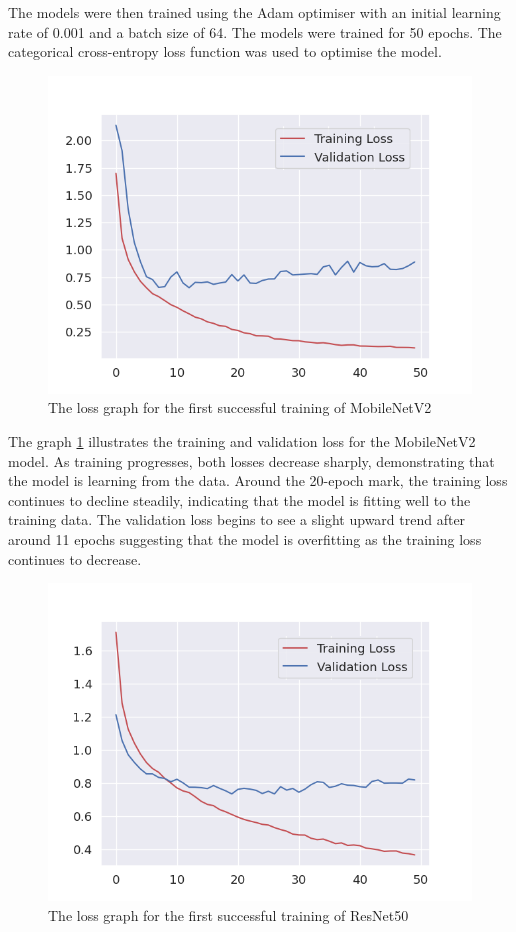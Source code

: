 The models were then trained using the Adam optimiser with an initial learning rate of 0.001 and a batch size of 64. The models were trained for 50 epochs. The categorical cross-entropy loss function was used to optimise the model.

\begin{figure}[H]
    \centering{}
    \includegraphics[scale=0.5]{fed_images/train_loss_MobileNetv2.png}
    \caption{The loss graph for the first successful training of MobileNetV2}
    \label{figure:loss_mnv2}
\end{figure}

The graph \ref{figure:loss_mnv2} illustrates the training and validation loss for the MobileNetV2 model. As training progresses, both losses decrease sharply, demonstrating that the model is learning from the data. Around the 20-epoch mark, the training loss continues to decline steadily, indicating that the model is fitting well to the training data. The validation loss begins to see a slight upward trend after around 11 epochs suggesting that the model is overfitting as the training loss continues to decrease.

\begin{figure}[H]
    \centering{}
    \includegraphics[scale=0.5]{fed_images/train_loss_ResNet50.png}
    \caption{The loss graph for the first successful training of ResNet50}
    \label{figure:loss_rn50}
\end{figure}

